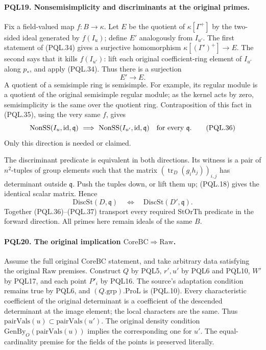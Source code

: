 \paragraph{PQL19. Nonsemisimplicity and discriminants at the original primes.}
\label{claim:PQL19}
Fix a field-valued map \(f:B\to\kappa\).
Let \(E\) be the quotient of \(\kappa[\Gamma^+]\)
by the two-sided ideal generated by \(f(I_u)\);
define \(E'\) analogously from \(I_{u'}\).
The first statement of (PQL.34) gives a surjective
homomorphism \(\kappa[(\Gamma')^+]\to E\).
The second says that it kills \(f(I_{u'})\):
lift each original coefficient-ring element of
\(I_{u'}\) along \(p_*\), and apply (PQL.34).
Thus there is a surjection
\[
                         E'\longrightarrow E.      \tag{PQL.35}
\]
A quotient of a semisimple ring is semisimple.
For example, its regular module is a quotient of
the original semisimple regular module; as the
kernel acts by zero, semisimplicity is the same
over the quotient ring. Contraposition of this
fact in (PQL.35), using the very same \(f\), gives
\[
 \mathrm{NonSS}(I_u,\mathrm{id},\mathfrak q)
 \ \Longrightarrow\
 \mathrm{NonSS}(I_{u'},\mathrm{id},\mathfrak q)
                  \quad\hbox{for every }\mathfrak q.         \tag{PQL.36}
\]
Only this direction is needed or claimed.

The discriminant predicate is equivalent in both
directions. Its witness is a pair of \(n^2\)-tuples
of group elements such that the matrix
\((\operatorname{tr}_D(g_i h_j))_{i,j}\)
has determinant outside \(\mathfrak q\).
Push the tuples down, or lift them up; (PQL.18)
gives the identical scalar matrix. Hence
\[
 \mathrm{DiscSt}(D,\mathfrak q)
       \quad\Longleftrightarrow\quad
 \mathrm{DiscSt}(D',\mathfrak q).                   \tag{PQL.37}
\]
Together (PQL.36)--(PQL.37) transport every required
\(\mathrm{StOrTh}\) predicate in the forward direction.
All primes here remain ideals of the same \(B\).

\paragraph{PQL20. The original implication \(\mathrm{CoreBC}\Rightarrow
\mathrm{Raw}\).}\label{claim:PQL20}
Assume the full original \(\mathrm{CoreBC}\) statement,
and take arbitrary data satisfying the original
\(\mathrm{Raw}\) premises. Construct \(Q\) by PQL5,
\(r',u'\) by PQL6 and PQL10, \(W'\) by PQL17,
and each point \(P'_i\) by PQL16.
The source's adaptation condition remains true by
PQL6, and \((Q.\mathrm{grp}).\mathrm{ProL}\) is
(PQL.10). Every characteristic coefficient of
the original determinant is a coefficient of
the descended determinant at the image element;
the local characters are the same. Thus
\(\mathrm{pairVals}(u)\subset\mathrm{pairVals}(u')\).
The original density condition
\(\mathrm{GenBy}_O(\mathrm{pairVals}(u))\)
implies the corresponding one for \(u'\).
The equal-cardinality premise for the fields of
the points is preserved literally.

